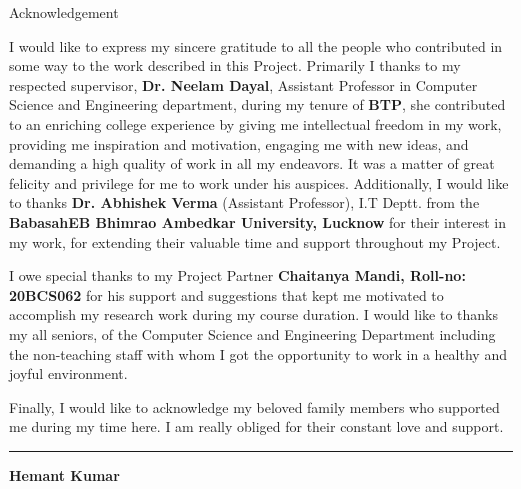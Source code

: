 \documentclass[12pt,twocolumn]{article}
\begin{document}
\begin{titlepage}
    \begin{center}
        \vspace*{1cm}
        
        {\englishtowne \LARGE Acknowledgement}
        
        \vspace{1.2cm}
        
       \large I would like to express my sincere gratitude to all the people who contributed in some way to the work described in this Project. Primarily I thanks to my respected supervisor, \textbf{Dr. Neelam Dayal}, Assistant Professor in Computer Science and Engineering department, during my tenure of \textbf{BTP}, she contributed to an enriching college experience by giving me intellectual freedom in my work, providing me inspiration and motivation, engaging me with new ideas, and demanding a high quality of work in all my endeavors. It was a matter of great felicity and privilege for me to work under his auspices. Additionally, I would like to thanks \textbf{Dr. Abhishek Verma} (Assistant Professor), I.T Deptt. from the \textbf{BabasahEB Bhimrao Ambedkar University, Lucknow} for their interest in my work, for extending their valuable time and support throughout my Project.

       I owe special thanks to my Project Partner \textbf{Chaitanya Mandi, Roll-no: 20BCS062} for his support and suggestions that kept me motivated to accomplish my research work during my course duration.  I would like to thanks my all seniors, of the Computer Science and Engineering Department including the non-teaching staff with whom I got the opportunity to work in a healthy and joyful environment.

       Finally, I would like to acknowledge my beloved family members who supported me during my time here. I am really obliged for their constant love and support.
        
        \vfill %
        
        \hrule %
        
        \vspace{1cm} %
        
    \hfill \textbf{Hemant Kumar}
        
        
        
    \end{center}
\end{titlepage}
\end{document}

